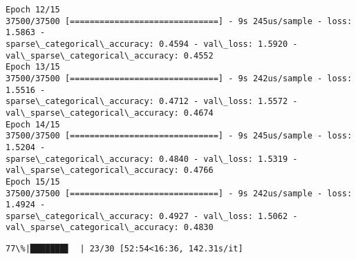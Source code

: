 \documentclass[11pt]{article}
\begin{document}
\begin{Verbatim}[commandchars=\\\{\}]
Epoch 12/15
37500/37500 [==============================] - 9s 245us/sample - loss: 1.5863 -
sparse\_categorical\_accuracy: 0.4594 - val\_loss: 1.5920 -
val\_sparse\_categorical\_accuracy: 0.4552
Epoch 13/15
37500/37500 [==============================] - 9s 242us/sample - loss: 1.5516 -
sparse\_categorical\_accuracy: 0.4712 - val\_loss: 1.5572 -
val\_sparse\_categorical\_accuracy: 0.4674
Epoch 14/15
37500/37500 [==============================] - 9s 245us/sample - loss: 1.5204 -
sparse\_categorical\_accuracy: 0.4840 - val\_loss: 1.5319 -
val\_sparse\_categorical\_accuracy: 0.4766
Epoch 15/15
37500/37500 [==============================] - 9s 242us/sample - loss: 1.4924 -
sparse\_categorical\_accuracy: 0.4927 - val\_loss: 1.5062 -
val\_sparse\_categorical\_accuracy: 0.4830
    \end{Verbatim}

    \begin{Verbatim}[commandchars=\\\{\}]
 77\%|███████▋  | 23/30 [52:54<16:36, 142.31s/it]
    \end{Verbatim}
\end{document}
